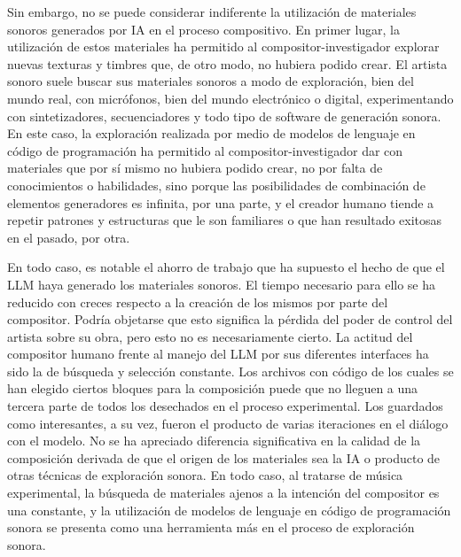 Sin embargo, no se puede considerar indiferente la utilización de materiales sonoros generados por IA en el proceso compositivo. En primer lugar, la utilización de estos materiales ha permitido al compositor-investigador explorar nuevas texturas y timbres que, de otro modo, no hubiera podido crear. El artista sonoro suele buscar sus materiales sonoros a modo de exploración, bien del mundo real, con micrófonos, bien del mundo electrónico o digital, experimentando con sintetizadores, secuenciadores y todo tipo de software de generación sonora. En este caso, la exploración realizada por medio de modelos de lenguaje en código de programación ha permitido al compositor-investigador dar con materiales que por sí mismo no hubiera podido crear, no por falta de conocimientos o habilidades, sino porque las posibilidades de combinación de elementos generadores es infinita, por una parte, y el creador humano tiende a repetir patrones y estructuras que le son familiares o que han resultado exitosas en el pasado, por otra.

En todo caso, es notable el ahorro de trabajo que ha supuesto el hecho de que el LLM haya generado los materiales sonoros. El tiempo necesario para ello se ha reducido con creces respecto a la creación de los mismos por parte del compositor. Podría objetarse que esto significa la pérdida del poder de control del artista sobre su obra, pero esto no es necesariamente cierto. La actitud del compositor humano frente al manejo del LLM por sus diferentes interfaces ha sido la de búsqueda y selección constante. Los archivos con código de los cuales se han elegido ciertos bloques para la composición puede que no lleguen a una tercera parte de todos los desechados en el proceso experimental. Los guardados como interesantes, a su vez, fueron el producto de varias iteraciones en el diálogo con el modelo. No se ha apreciado diferencia significativa en la calidad de la composición derivada de que el origen de los materiales sea la IA o producto de otras técnicas de exploración sonora. En todo caso, al tratarse de música experimental, la búsqueda de materiales ajenos a la intención del compositor es una constante, y la utilización de modelos de lenguaje en código de programación sonora se presenta como una herramienta más en el proceso de exploración sonora.

